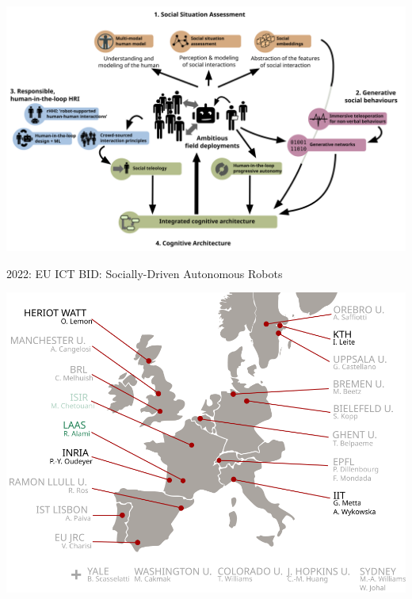 \documentclass[xcolor=table]{beamer}
\begin{document}
\begin{frame}
\begin{center}
{        \includegraphics[trim=8cm 0 8cm 16cm,clip,width=\linewidth]{architectures/wps}
    }
    \end{center}
\end{frame}

\begin{frame}{2022: EU ICT BID: Socially-Driven Autonomous Robots}
    \begin{center}
        \includegraphics[width=0.8\linewidth]{collaborations_map_project}
    \end{center}
\end{frame}
\end{document}
